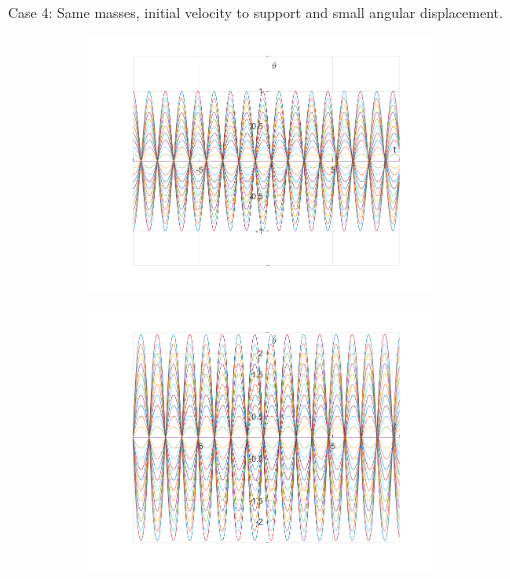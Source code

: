 \documentclass{article}
\begin{document}
	
	Case 4:
	Same masses, initial velocity to support and small angular displacement.
		\begin{figure}[h!]
		\centering
		\begin{subfigure}[b]{0.48\linewidth}
			\includegraphics[width=\linewidth]{./SmallOscillations/S4/F1.png}
		\end{subfigure}
		\begin{subfigure}[b]{0.48\linewidth}
			\includegraphics[width=\linewidth]{./SmallOscillations/S4/F2.png}
		\end{subfigure}
	\end{figure}
\end{document}
